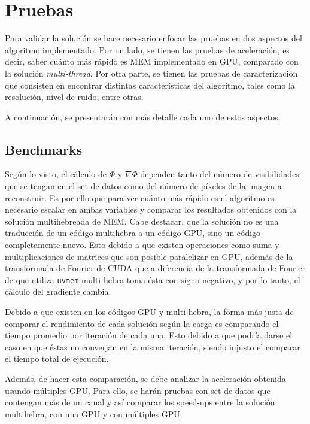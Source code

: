 \chapter{Pruebas}
\label{cap:pruebas}

Para validar la solución se hace necesario enfocar las pruebas en dos aspectos del algoritmo implementado. Por un lado, se tienen las pruebas de aceleración, es decir, saber cuánto más rápido es MEM implementado en GPU, comparado con la solución \textit{multi-thread}. Por otra parte, se tienen las pruebas de caracterización que consisten en encontrar distintas características del algoritmo, tales como la resolución, nivel de ruido, entre otras.

A continuación, se presentarán con más detalle cada uno de estos aspectos.

\section{Benchmarks}
Según lo visto, el cálculo de $\Phi$ y $\nabla \Phi$ dependen tanto del número de visibilidades que se tengan en el set de datos como del número de píxeles de la imagen a reconstruir. Es por ello que para ver cuánto más rápido es el algoritmo es necesario escalar en ambas variables y comparar los resultados obtenidos con la solución multihebreada de MEM. Cabe destacar, que la solución no es una traducción de un código multihebra a un código GPU, sino un código completamente nuevo. Esto debido a que existen operaciones como suma y multiplicaciones de matrices que son posible paralelizar en GPU, además de la transformada de Fourier de CUDA \citep{cudafft} que a diferencia de la transformada de Fourier de \citep{numericalrecipes} que utiliza \texttt{uvmem} multi-hebra toma ésta con signo negativo, y por lo tanto, el cálculo del gradiente cambia.

Debido a que existen en los códigos GPU y multi-hebra, la forma más justa de comparar el rendimiento de cada solución según la carga es comparando el tiempo promedio por iteración de cada una. Esto debido a que podría darse el caso en que éstas no converjan en la misma iteración, siendo injusto el comparar el tiempo total de ejecución.

Además, de hacer esta comparación, se debe analizar la aceleración obtenida usando múltiples GPU. Para ello, se harán pruebas con set de datos que contengan más de un canal y así comparar los speed-ups entre la solución multihebra, con una GPU y con múltiples GPU.

